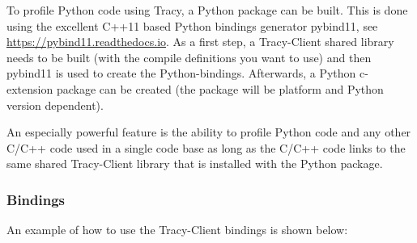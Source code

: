 \documentclass[hidelinks,titlepage,a4paper,twoside]{article}
\begin{document}
To profile Python code using Tracy, a Python package can be built. This is done using the excellent C++11 based Python bindings generator pybind11, see \url{https://pybind11.readthedocs.io}.
As a first step, a Tracy-Client shared library needs to be built (with the compile definitions you want to use) and then pybind11 is used to create the Python-bindings.
Afterwards, a Python c-extension package can be created (the package will be platform and Python version dependent).

An especially powerful feature is the ability to profile Python code and any other C/C++ code used in a single code base as long as the C/C++ code links to the same shared Tracy-Client library that is installed with the Python package.

\subsubsection{Bindings}

An example of how to use the Tracy-Client bindings is shown below:
\end{document}
